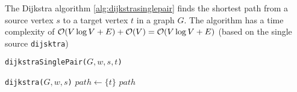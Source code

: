 \documentclass{article}
\begin{document}
The Dijkstra algorithm \ref{alg:dijkstrasinglepair} finds the shortest path from a source vertex $s$ to a target vertex $t$ in a graph $G$. The algorithm has a time complexity of $\mathcal{O}(V\log V+E)+\mathcal{O}(V)=\mathcal{O}(V\log V+E)$ (based on the single source \texttt{dijsktra})\par
\begin{algorithm}[H]
  \caption{\texttt{dijkstraSinglePair($G, w, s, t$)}}\label{alg:dijkstrasinglepair}

  \BlankLine

  \texttt{dijkstra($G, w, s$)}\;
  $path \gets \{t\}$\;
  \Return $path$
\end{algorithm}
\end{document}
